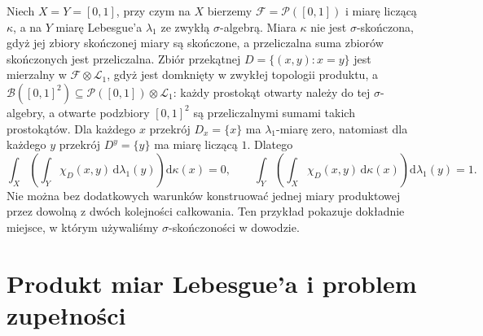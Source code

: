\begin{przyklad}
\label{ex:non-sigma-tonelli-12}
Niech $X=Y=[0,1]$, przy czym na $X$ bierzemy
$\mathcal F=\mathcal P([0,1])$ i miarę liczącą $\kappa$,
a na $Y$ miarę Lebesgue'a $\lambda_1$ ze zwykłą
$\sigma$-algebrą. Miara $\kappa$ nie jest
$\sigma$-skończona, gdyż jej zbiory skończonej
miary są skończone, a przeliczalna suma zbiorów
skończonych jest przeliczalna.
Zbiór przekątnej $D=\{(x,y):x=y\}$ jest
mierzalny w $\mathcal F\otimes\mathcal L_1$,
gdyż jest domknięty w zwykłej topologii produktu,
a $\mathcal B([0,1]^2)\subseteq\mathcal P([0,1])\otimes\mathcal L_1$:
każdy prostokąt otwarty należy do tej $\sigma$-algebry,
a otwarte podzbiory $[0,1]^2$ są przeliczalnymi sumami
takich prostokątów.
Dla każdego $x$ przekrój $D_x=\{x\}$ ma
$\lambda_1$-miarę zero, natomiast dla każdego $y$
przekrój $D^y=\{y\}$ ma miarę liczącą $1$.
Dlatego
\[
\int_X\left(\int_Y\chi_D(x,y)\,
\mathrm d\lambda_1(y)\right)\mathrm d\kappa(x)=0,
\qquad
\int_Y\left(\int_X\chi_D(x,y)\,
\mathrm d\kappa(x)\right)\mathrm d\lambda_1(y)=1.
\]
Nie można bez dodatkowych warunków konstruować
jednej miary produktowej przez dowolną z dwóch
kolejności całkowania. Ten przykład pokazuje
dokładnie miejsce, w którym używaliśmy
$\sigma$-skończoności w dowodzie.
\end{przyklad}

\section{Produkt miar Lebesgue'a i problem zupełności}

